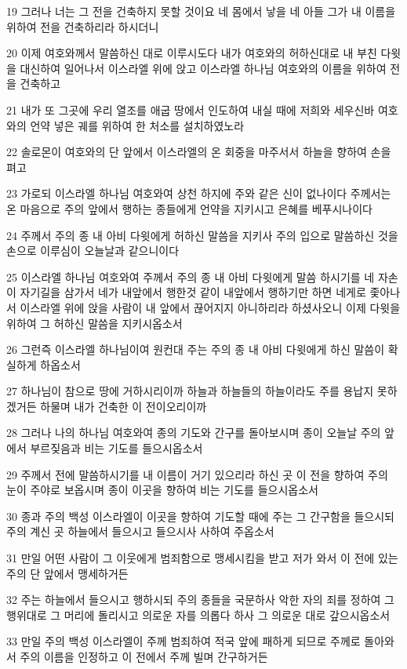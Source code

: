 \par 19 그러나 너는 그 전을 건축하지 못할 것이요 네 몸에서 낳을 네 아들 그가 내 이름을 위하여 전을 건축하리라 하시더니
\par 20 이제 여호와께서 말씀하신 대로 이루시도다 내가 여호와의 허하신대로 내 부친 다윗을 대신하여 일어나서 이스라엘 위에 앉고 이스라엘 하나님 여호와의 이름을 위하여 전을 건축하고
\par 21 내가 또 그곳에 우리 열조를 애굽 땅에서 인도하여 내실 때에 저희와 세우신바 여호와의 언약 넣은 궤를 위하여 한 처소를 설치하였노라
\par 22 솔로몬이 여호와의 단 앞에서 이스라엘의 온 회중을 마주서서 하늘을 향하여 손을 펴고
\par 23 가로되 이스라엘 하나님 여호와여 상천 하지에 주와 같은 신이 없나이다 주께서는 온 마음으로 주의 앞에서 행하는 종들에게 언약을 지키시고 은혜를 베푸시나이다
\par 24 주께서 주의 종 내 아비 다윗에게 허하신 말씀을 지키사 주의 입으로 말씀하신 것을 손으로 이루심이 오늘날과 같으니이다
\par 25 이스라엘 하나님 여호와여 주께서 주의 종 내 아비 다윗에게 말씀 하시기를 네 자손이 자기길을 삼가서 네가 내앞에서 행한것 같이 내앞에서 행하기만 하면 네게로 좇아나서 이스라엘 위에 앉을 사람이 내 앞에서 끊어지지 아니하리라 하셨사오니 이제 다윗을 위하여 그 허하신 말씀을 지키시옵소서
\par 26 그런즉 이스라엘 하나님이여 원컨대 주는 주의 종 내 아비 다윗에게 하신 말씀이 확실하게 하옵소서
\par 27 하나님이 참으로 땅에 거하시리이까 하늘과 하늘들의 하늘이라도 주를 용납지 못하겠거든 하물며 내가 건축한 이 전이오리이까
\par 28 그러나 나의 하나님 여호와여 종의 기도와 간구를 돌아보시며 종이 오늘날 주의 앞에서 부르짖음과 비는 기도를 들으시옵소서
\par 29 주께서 전에 말씀하시기를 내 이름이 거기 있으리라 하신 곳 이 전을 향하여 주의 눈이 주야로 보옵시며 종이 이곳을 향하여 비는 기도를 들으시옵소서
\par 30 종과 주의 백성 이스라엘이 이곳을 향하여 기도할 때에 주는 그 간구함을 들으시되 주의 계신 곳 하늘에서 들으시고 들으시사 사하여 주옵소서
\par 31 만일 어떤 사람이 그 이웃에게 범죄함으로 맹세시킴을 받고 저가 와서 이 전에 있는 주의 단 앞에서 맹세하거든
\par 32 주는 하늘에서 들으시고 행하시되 주의 종들을 국문하사 악한 자의 죄를 정하여 그 행위대로 그 머리에 돌리시고 의로운 자를 의롭다 하사 그 의로운 대로 갚으시옵소서
\par 33 만일 주의 백성 이스라엘이 주께 범죄하여 적국 앞에 패하게 되므로 주께로 돌아와서 주의 이름을 인정하고 이 전에서 주께 빌며 간구하거든
